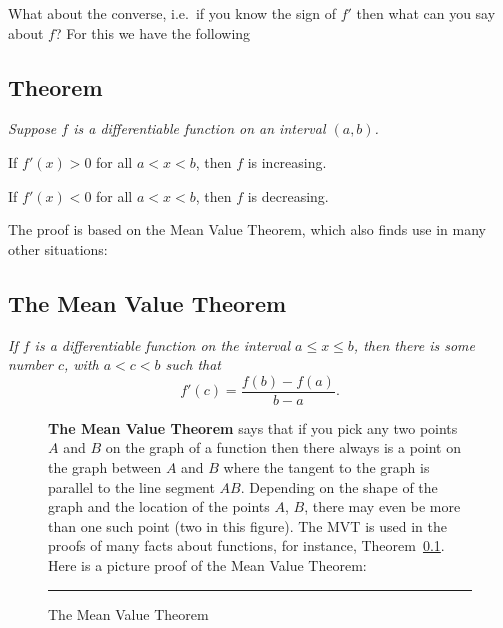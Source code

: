 What about the converse, i.e.\ if you know the sign of $f'$ then what can you
say about $f$?  For this we have the following
\subsection{Theorem}
\label{thm:deriv-pos-implies-increasing}\itshape
Suppose $f$ is a differentiable function on an interval $(a,b)$.

If $f'(x)>0$ for all $a<x<b$, then $f$ is increasing.

If $f'(x)<0$ for all $a<x<b$, then $f$ is decreasing.\upshape
\medskip

The proof is based on the Mean Value Theorem, which also finds use in
many other situations:
\subsection{The Mean Value Theorem}
\itshape
If $f$ is a differentiable function on the interval $a\leq x\leq b$,
then there is some number $c$, with $a<c<b$ such that
\[
f'(c) = \frac{f(b)-f(a)}{b-a}.
\]
\upshape

\begin{figure}[t]\flushleft\sffamily
  \color{darkbluegreen}
  \parbox[b]{0.45\textwidth}{\textbf{The Mean Value Theorem }says that
    if you pick any two points $A$ and $B$ on the graph of a function
    then there always is a point on the graph between $A$ and $B$ 
    where the tangent to the graph is parallel to the line segment
    $AB$.  Depending on the shape of the graph and the location of the
    points $A$, $B$, there may even be more than one such point (two
    in this figure).  The MVT is used in the proofs of many facts
    about functions, for instance,
    Theorem~\ref{thm:deriv-pos-implies-increasing}.  Here is a picture
  proof of the Mean Value Theorem:}
  \hfill
  \parbox[b]{0.4\textwidth}{ }

  \def\mvtprooftextone{%
    \parbox[t]{80pt}{\sffamily\itshape\footnotesize\color{darkbluegreen}%
      To find a point on this curve where the tangent is parallel to
      the chord $AB$, you draw two lines \ldots}}

  \def\mvtprooftexttwo{%
    \parbox[b]{96pt}{\sffamily\itshape\footnotesize\color{darkbluegreen}%
      \ldots parallel to the chord, one far above the graph
      and one far below the graph.  Then, always keeping these lines
      parallel to the chord,  you slide them towards the graph \ldots }}

  \def\mvtprooftextthree{%
    \parbox[b]{96pt}{\sffamily\itshape\footnotesize\color{darkbluegreen}%
      \ldots until they touch the
      graph.  At the points where the lines touch the graph, the
      tangent to the graph is parallel to the chord $AB$. }}
  
  \def\mvtproofthechord{{\sffamily\itshape\footnotesize\color{darkbluegreen} The
  chord $AB$}}

  

  \caption{The Mean Value Theorem}
  \label{fig:05MeanValueTheorem}
  \rule{\textwidth}{2pt}
\end{figure}


